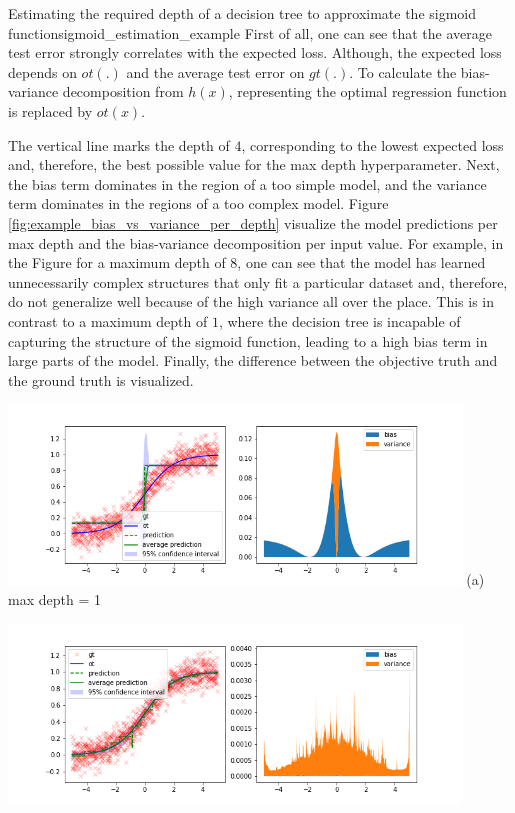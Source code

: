\begin{Bsp}{Estimating the required depth of a decision tree to approximate the sigmoid function}{sigmoid_estimation_example}
First of all, one can see that the average test error strongly correlates with the expected loss. Although, the expected loss depends on $ot(.)$ and the average test error on $gt(.)$. To calculate the bias-variance decomposition from \cite{bishop2006pattern} $h(x)$, representing the optimal regression function is replaced by $ot(x)$.

The vertical line marks the depth of $4$, corresponding to the lowest expected loss and, therefore, the best possible value for the max depth hyperparameter. Next, the bias term dominates in the region of a too simple model, and the variance term dominates in the regions of a too complex model. Figure \ref{fig:example_bias_vs_variance_per_depth} visualize the model predictions per max depth and the bias-variance decomposition per input value. For example, in the Figure for a maximum depth of 8, one can see that the model has learned unnecessarily complex structures that only fit a particular dataset and, therefore, do not generalize well because of the high variance all over the place.  This is in contrast to a maximum depth of $1$, where the decision tree is incapable of capturing the structure of the sigmoid function, leading to a high bias term in large parts of the model.
Finally, the difference between the objective truth and the ground truth is visualized.
\captionsetup{type=htypei}
\begin{minipage}[t]{\linewidth}
    \centering
    \vspace{1ex}
    \begin{minipage}{\linewidth}
        \centering
        \includegraphics[width=12cm]{images/ml_basics/depth_1.png}\newline
        (a) max depth = 1
    \end{minipage}
    \vspace{0.3cm}
    \begin{minipage}{\linewidth}
        \centering
        \includegraphics[width=12cm]{images/ml_basics/depth_4.png}\newline

\end{minipage}
\end{minipage}
\end{Bsp}
